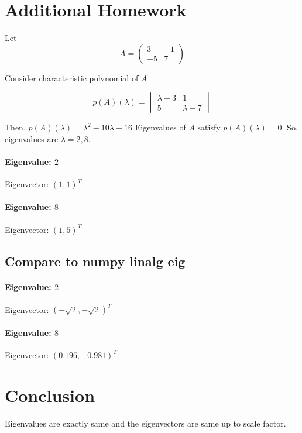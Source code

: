 \documentclass{article}
\begin{document}
\section{Additional Homework}

Let 
$$
A = \begin{pmatrix}
3 & -1 \\
-5 & 7
\end{pmatrix}
$$

Consider characteristic polynomial of $A$

$$
p(A)(\lambda) = \begin{vmatrix}
\lambda -3 & 1 \\
5 & \lambda -7
\end{vmatrix}
$$

Then, $p(A)(\lambda) = \lambda^2 - 10\lambda + 16$
Eigenvalues of $A$ satisfy $p(A)(\lambda)=0$. So, eigenvalues are 
$\lambda=2,8.$

\paragraph{Eigenvalue: $2$}
  Eigenvector: $(1,1)^T$
  
\paragraph{Eigenvalue: $8$}
  Eigenvector: $(1,5)^T$

\subsection{Compare to numpy linalg eig}

\paragraph{Eigenvalue: $2$}
  Eigenvector: $(-\sqrt{2}, -\sqrt{2})^T$

\paragraph{Eigenvalue: $8$}
  Eigenvector: $(0.196, -0.981)^T$

\section{Conclusion}
Eigenvalues are exactly same and the eigenvectors are same up to scale factor.
\end{document}
